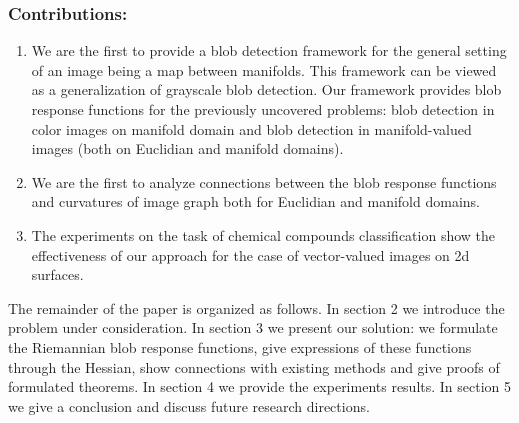 \documentclass{llncs}
\begin{document}
\subsubsection{Contributions:}
\begin{enumerate}
\item We are the first to provide a blob detection framework for the general setting of an image being a map between manifolds. This framework can be viewed as a generalization of grayscale blob detection. Our framework provides blob response functions for the previously uncovered problems: blob detection in color images on manifold domain and blob detection in manifold-valued images (both on Euclidian and manifold domains). 
\item We are the first to analyze connections between the blob response functions and curvatures of image graph both for Euclidian and manifold domains.
\item The experiments on the task of chemical compounds classification show the effectiveness of our approach for the case of vector-valued images on 2d surfaces.  
\end{enumerate}

The remainder of the paper is organized as follows. In section 2 we introduce the problem under consideration. In section 3 we present our solution: we formulate the Riemannian blob response functions, give expressions of these functions through the Hessian, show connections with existing methods and give proofs of formulated theorems. In section 4 we provide the experiments results. In section 5 we give a conclusion and discuss future research directions.
\end{document}
